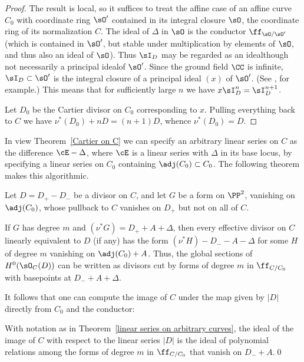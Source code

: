 \begin{proof}
The result is local, so it suffices to treat the affine case of an affine
curve $C_{0}$ with coordinate
ring $\sO'$ contained
in its integral closure $\sO$, the coordinate ring of its normalization
%
$C$.
The ideal of $\Delta$ in $\sO$ is the conductor $\ff_{\sO/{\sO'}}$
(which is contained in $\sO'$, but stable under
multiplication by elements of $\sO$, and thus also an ideal of $\sO$).
Thus $\sI_{D}$ may be regarded as an ideal\emdash though not necessarily
a principal ideal\emdash of $\sO'$. Since the  ground field $\CC$ is
infinite, $\sI_{D}\subset \sO'$ is the integral closure of a principal
ideal $(x)$
of $\sO'$.
(See \cite[Chapter 8]{Swanson-Huneke}, for example.)
This means that for sufficiently large $n$ we have $x\sI_{D}^{n} =
\sI_{D}^{n+1}$.

Let $D_{0}$ be the Cartier divisor on $C_{0}$ corresponding to
$x$. Pulling everything back to $C$
we have
$
\nu^*(D_{0})+nD = (n+1)D
$,
whence $\nu^*(D_{0}) = D$.
 \end{proof}

In view Theorem~\ref{Cartier on C} we can specify an arbitrary linear
series on $C$
as the difference $\cE - \Delta$, where $\cE$ is a linear series with
$\Delta$ in its base locus, by specifying a
linear series on $C_0$ containing  $\adj(C_{0})\subset C_{0}$. The
following theorem makes
this algorithmic.

\begin{theorem}\label{linear series on arbitrary curves}
Let $D = D_{+}-D_{-}$ be a divisor on $C$, and let $G$ be a form on
$\PP^{2}$,
vanishing on $\adj(C_{0})$, whose pullback to $C$
vanishes on $D_{+}$ but not on all of $C$.

If $G$ has degree $m$ and $(\nu^{*}G) = D_{+}+A+\Delta$, then every
effective divisor on
$C$ linearly equivalent to $D$ (if any) has the form
$(\nu^*H)-D_{-}-A-\Delta$ for some $H$ of degree $m$
 vanishing on $\adj(C_{0})+A$. Thus, the global sections of
 $H^{0}(\sO_{C}(D))$ can be written
as divisors cut by forms of degree $m$ in $\ff_{C/C_{0}}$ with basepoints
at $D_{-}+A+\Delta$.
\unif
\end{theorem}

It follows that one can compute the image of $C$ under the
map given by $|D|$ directly from $C_{0}$ and the conductor:

\begin{corollary}
With notation as in Theorem~\ref{linear series on arbitrary curves},
the ideal of the image of
$C$ with respect to the linear series $|D|$ is the ideal of polynomial
relations among the forms
of degree $m$ in $\ff_{C/C_{0}}$ that vanish on $D_{-}+A$.\qed
\unif
\end{corollary}

